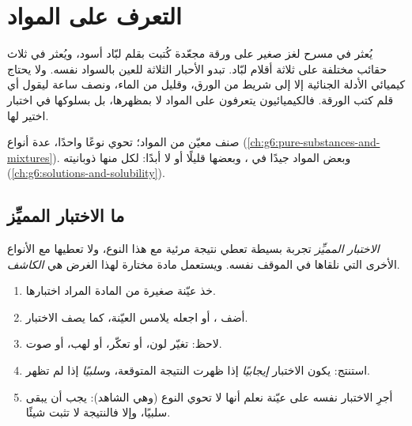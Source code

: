 \chapter{التعرف على المواد}\label{ch:g7:identifying-substances}

يُعثر في مسرح لغز صغير على ورقة مجعّدة كُتبت بقلم لبّاد أسود، ويُعثر في
ثلاث حقائب مختلفة على ثلاثة أقلام لبّاد. تبدو الأحبار الثلاثة للعين بالسواد
نفسه. ولا يحتاج كيميائي الأدلة الجنائية إلا إلى شريط من الورق، وقليل من
الماء، ونصف ساعة ليقول أي قلم كتب الورقة. فالكيميائيون يتعرفون على
المواد لا بمظهرها، بل بسلوكها في اختبار اختير لها.

\begin{recall}
 صنف معيّن من المواد؛  تحوي نوعًا واحدًا،
 عدة أنواع (\cref{ch:g6:pure-substances-and-mixtures}). وبعض
المواد  جيدًا في ، وبعضها قليلًا أو لا  أبدًا: لكل منها
ذوبانيته (\cref{ch:g6:solutions-and-solubility}).
\end{recall}

\section{ما الاختبار المميِّز}

\begin{definition}\label{def:g7:identifying-substances:characteristic-test}
\emph{الاختبار المميِّز}  تجربة بسيطة
تعطي نتيجة مرئية مع هذا النوع، ولا تعطيها مع الأنواع الأخرى التي نلقاها
في الموقف نفسه. ويستعمل مادة مختارة لهذا الغرض هي
\emph{الكاشف}.
\end{definition}


\begin{method}\label{met:g7:identifying-substances:run}
\begin{enumerate}
  \item خذ عيّنة صغيرة من المادة المراد اختبارها.
  \item أضف ، أو اجعله يلامس العيّنة، كما يصف
        الاختبار.
  \item لاحظ: تغيّر لون، أو تعكّر، أو لهب، أو صوت.
  \item استنتج: يكون الاختبار \emph{إيجابيًا} إذا ظهرت النتيجة
        المتوقعة، و\emph{سلبيًا} إذا لم تظهر.
  \item أجرِ الاختبار نفسه على عيّنة نعلم أنها لا تحوي النوع
        (وهي الشاهد): يجب أن يبقى سلبيًا، وإلا فالنتيجة لا تثبت
        شيئًا.
\end{enumerate}
\end{method}

